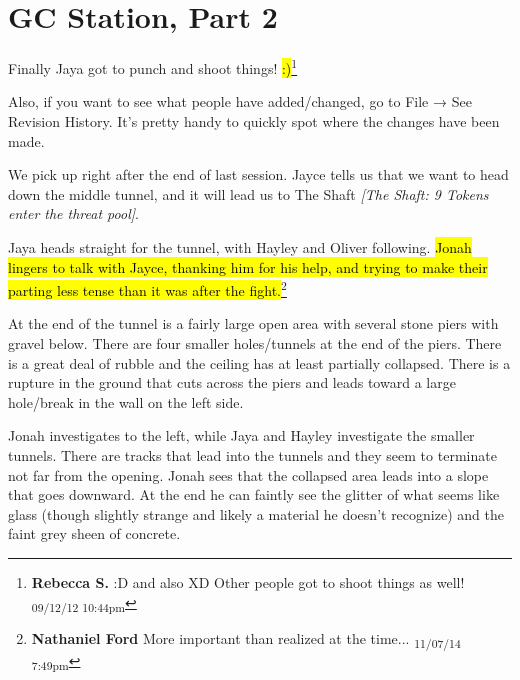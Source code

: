 \setcounter{chapter}{ 6 }
\chapter{\textbf{GC Station, Part 2} }





Finally Jaya got to punch and shoot things!   \hl{:)}\footnote{\textbf{Rebecca S. }:D  and also  XD  
Other people got to shoot things as well! \textsubscript{09/12/12 10:44pm}}



Also, if you want to see what people have added/changed, go to File → See Revision History.  It's pretty handy to quickly spot where the changes have been made.



\noindent\hrulefill








We pick up right after the end of last session.  Jayce tells us that we want to head down the middle tunnel, and it will lead us to The Shaft \textit{{[}The Shaft: 9 Tokens enter the threat pool{]}}.



Jaya heads straight for the tunnel, with Hayley and Oliver following.  \hl{Jonah lingers to talk with Jayce, thanking him for his help, and trying to make their parting less tense than it was after the fight.}\footnote{\textbf{Nathaniel Ford }More important than realized at the time... \textsubscript{11/07/14 7:49pm}}



At the end of the tunnel is a fairly large open area with several stone piers with gravel below.  There are four smaller holes/tunnels at the end of the piers.  There is a great deal of rubble and the ceiling has at least partially collapsed.  There is a rupture in the ground that cuts across the piers and leads toward a large hole/break in the wall on the left side.  



Jonah investigates to the left, while Jaya and Hayley investigate the smaller tunnels. There are tracks that lead into the tunnels and they seem to terminate not far from the opening.  Jonah sees that the collapsed area leads into a slope that goes downward.  At the end he can faintly see the glitter of what seems like glass (though slightly strange and likely a material he doesn't recognize) and the faint grey sheen of concrete.



